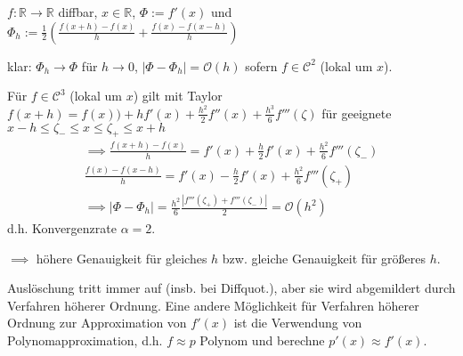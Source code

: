 \begin{example}
	$f:\mathbb{R} \rightarrow \mathbb{R}$ diffbar, $x\in \mathbb{R}$, $\Phi := f'(x)$ und $\Phi_h := \frac{1}{2} \left(\frac{f(x+h)-f(x)}{h} + \frac{f(x)-f(x-h)}{h}\right)$
	
	klar: $\Phi_h \rightarrow \Phi$ für $h \rightarrow 0$, $|\Phi - \Phi_h| = \mathcal{O}(h)$ sofern $f \in \mathcal{C}^2$ (lokal um $x$).
	
	Für $f \in \mathcal{C}^3$ (lokal um $x$) gilt mit Taylor $f(x+h) = f(x)) + hf'(x) + \frac{h^2}{2}f''(x) + \frac{h^3}{6}f'''(\zeta)$ für geeignete $x-h \leq \zeta_- \leq x \leq \zeta_+ \leq x+h$
	\begin{align*}
		\implies \frac{f(x+h)-f(x)}{h} = f'(x) + \frac{h}{2} f'(x) + \frac{h^2}{6} f'''(\zeta_-)\\
		\frac{f(x)-f(x-h)}{h} = f'(x) - \frac{h}{2} f'(x) + \frac{h^2}{6} f'''(\zeta_+)\\
		\implies |\Phi - \Phi_h| = \frac{h^2}{6} \frac{|f'''(\zeta_+) + f'''(\zeta_-)|}{2} = \mathcal{O}(h^2)
	\end{align*}
	d.h. Konvergenzrate $\alpha = 2$.
	
	$\implies$ höhere Genauigkeit für gleiches $h$ bzw. gleiche Genauigkeit für größeres $h$.
\end{example}

\begin{remark}
	Auslöschung tritt immer auf (insb. bei Diffquot.), aber sie wird abgemildert durch Verfahren höherer Ordnung. Eine andere Möglichkeit für Verfahren höherer Ordnung zur Approximation von $f'(x)$ ist die Verwendung von Polynomapproximation, d.h. $f \approx p$ Polynom und berechne $p'(x) \approx f'(x)$.
\end{remark}
